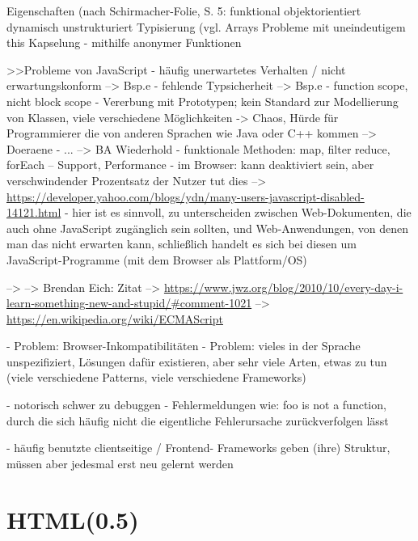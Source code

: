 \documentclass[a4paper, 12pt, hidelinks, listof=totoc, listoftables=totoc, bibliography=totoc]{scrreprt}
\begin{document}
Eigenschaften (nach Schirmacher-Folie, S. 5: %
	funktional
	objektorientiert
	dynamisch
	unstrukturiert
	Typisierung (vgl. %
	Arrays
	Probleme mit uneindeutigem this
	Kapselung - mithilfe anonymer Funktionen
	
                             
>>Probleme von JavaScript
- häufig unerwartetes Verhalten / nicht erwartungskonform  -->  Bsp.e
- fehlende Typsicherheit  -->  Bsp.e
- function scope, nicht block scope
- Vererbung mit Prototypen; kein Standard zur Modellierung von Klassen, viele verschiedene Möglichkeiten  ->  Chaos, Hürde für Programmierer die von anderen Sprachen wie Java oder C++ kommen
-->  Doeraene
- ...
-->  BA Wiederhold
- funktionale Methoden: map, filter reduce, forEach -- Support, Performance
- im Browser: kann deaktiviert sein, aber verschwindender Prozentsatz der Nutzer tut dies  -->  \url{https://developer.yahoo.com/blogs/ydn/many-users-javascript-disabled-14121.html}
	- hier ist es sinnvoll, zu unterscheiden zwischen Web-Dokumenten, die auch ohne JavaScript zugänglich sein sollten, und Web-Anwendungen, von denen man das nicht erwarten kann, schließlich handelt es sich bei diesen um JavaScript-Programme (mit dem Browser als Plattform/OS)
	\cite[S.311]{flanagan2011.JDG}

-->  \cite{flanagan2011.JDG}
-->  \cite{crockford2008.JSG}
Brendan Eich: Zitat  -->  \url{https://www.jwz.org/blog/2010/10/every-day-i-learn-something-new-and-stupid/#comment-1021}
-->  \url{https://en.wikipedia.org/wiki/ECMAScript}

- Problem: Browser-Inkompatibilitäten
- Problem: vieles in der Sprache unspezifiziert, Lösungen dafür existieren, aber sehr viele Arten, etwas zu tun (viele verschiedene Patterns, viele verschiedene Frameworks)

- notorisch schwer zu debuggen - Fehlermeldungen wie: foo is not a function, durch die sich häufig nicht die eigentliche Fehlerursache zurückverfolgen lässt


- häufig benutzte clientseitige / Frontend- Frameworks geben (ihre) Struktur, müssen aber jedesmal erst neu gelernt werden


\section{HTML(0.5)}

\end{document}
